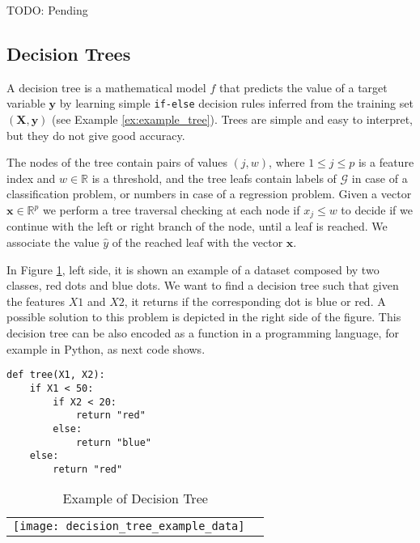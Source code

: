 {\color{red} TODO: Pending}


\subsection{Decision Trees}
\label{subsec:learning_decision_trees}

A decision tree is a mathematical model $f$ that predicts the value of a target variable $\mathbf{y}$ by learning simple \texttt{if-else} decision rules inferred from the training set $(\mathbf{X}, \mathbf{y})$ (see Example \ref{ex:example_tree}). Trees are simple and easy to interpret, but they do not give good accuracy.


The nodes of the tree contain pairs of values $(j, w)$, where $1 \leq j \leq p$ is a feature index and $w \in \mathbb{R}$ is a threshold, and the tree leafs contain labels of $\mathcal{G}$ in case of a classification problem, or numbers in case of a regression problem. Given a vector $\textbf{x} \in \mathbb{R}^p$ we perform a tree traversal checking at each node if $x_j \leq w$ to decide if we continue with the left or right branch of the node, until a leaf is reached. We associate the value $\hat{y}$ of the reached leaf with the vector $\textbf{x}$.

\begin{example}
    \label{ex:example_tree}
    In Figure \ref{tab:DecisionTreeExample}, left side, it is shown an example of a dataset composed by two classes, red dots and blue dots. We want to find a decision tree such that given the features $X1$ and $X2$, it returns if the corresponding dot is blue or red. A possible solution to this problem is depicted in the right side of the figure. This decision tree can be also encoded as a function in a programming language, for example in Python, as next code shows.

    \begin{sourcecode}
        {\scriptsize \begin{verbatim}
def tree(X1, X2):
    if X1 < 50:
        if X2 < 20:
            return "red"
        else:
            return "blue"
    else:
        return "red"
\end{verbatim}}
    \end{sourcecode}

\end{example}

\begin{table}
    \begin{center}

        \begin{tabular}{ c c }

            \texttt{[image: decision\_tree\_example\_data]} & \raisebox{.4\height}{\texttt{[image: decision\_tree\_example]}}
        \end{tabular}
    \end{center}
    \caption{\label{tab:DecisionTreeExample}Example of Decision Tree}
\end{table}

